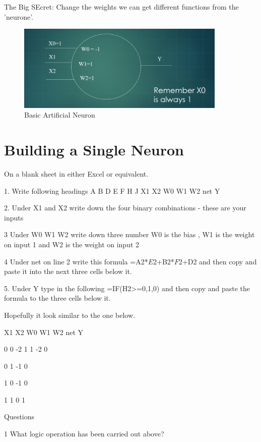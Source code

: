 The Big SEcret: Change the weights we can get different functions from the 'neurone'.

\begin{figure}
    \centering
    \includegraphics[width=10cm]{chapters/chAi1/figures/overall neurone2.png}
    \caption{Basic Artificial Neuron}
    \label{fig:basicneuron}
\end{figure}

\section{Building a Single Neuron}

On a blank sheet in either Excel or equivalent. 

1.  Write following headings 
A                B                            D                 E                 F                                      H                             J
X1	X2	 	W0	W1	W2	 	net 	 	Y

2.  Under X1 and X2 write down the four binary combinations - these are your inputs 

3   Under W0 W1 W2 write down three number W0 is the bias , W1 is the weight on input 1 and W2 is the weight on input 2

4 Under net on line 2 write this formula  =A2*$E$2+B2*$F$2+D2 and then copy and paste it into the next three cells below it.

5. Under Y type in the following  =IF(H2>=0,1,0)  and then copy and paste the formula to the three cells below it.


Hopefully it look similar to the one below.

X1	X2	 	W0	W1	W2	 	net 	 	Y

0	0	 	-2	1	1	 	-2	 	0

0	1	 	 	 	 	 	-1	 	0

1	0	 	 	 	 	 	-1	 	0

1	1	 	 	 	 	 	0	 	1


Questions

1 What logic operation has been carried out above?

